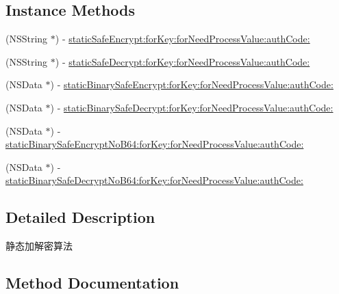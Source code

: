 \subsection*{Instance Methods}
\begin{DoxyCompactItemize}
\item 
(N\+S\+String $\ast$) -\/ \mbox{\hyperlink{protocol_i_open_static_data_encrypt_component_01-p_ae9cf27ee8ba201a8301ed2203f054a91}{static\+Safe\+Encrypt\+:for\+Key\+:for\+Need\+Process\+Value\+:auth\+Code\+:}}
\item 
(N\+S\+String $\ast$) -\/ \mbox{\hyperlink{protocol_i_open_static_data_encrypt_component_01-p_a13515b4080b8829fdb8a08d432498fed}{static\+Safe\+Decrypt\+:for\+Key\+:for\+Need\+Process\+Value\+:auth\+Code\+:}}
\item 
(N\+S\+Data $\ast$) -\/ \mbox{\hyperlink{protocol_i_open_static_data_encrypt_component_01-p_a7221e47b36d729180d20d1efbaedde78}{static\+Binary\+Safe\+Encrypt\+:for\+Key\+:for\+Need\+Process\+Value\+:auth\+Code\+:}}
\item 
(N\+S\+Data $\ast$) -\/ \mbox{\hyperlink{protocol_i_open_static_data_encrypt_component_01-p_a55b365d73c01bf7ad325985bbd83ee64}{static\+Binary\+Safe\+Decrypt\+:for\+Key\+:for\+Need\+Process\+Value\+:auth\+Code\+:}}
\item 
(N\+S\+Data $\ast$) -\/ \mbox{\hyperlink{protocol_i_open_static_data_encrypt_component_01-p_a907c76770df9f876dfd14da3b81c75d0}{static\+Binary\+Safe\+Encrypt\+No\+B64\+:for\+Key\+:for\+Need\+Process\+Value\+:auth\+Code\+:}}
\item 
(N\+S\+Data $\ast$) -\/ \mbox{\hyperlink{protocol_i_open_static_data_encrypt_component_01-p_ad03f7147c6e686a8dfa8a25d9de50083}{static\+Binary\+Safe\+Decrypt\+No\+B64\+:for\+Key\+:for\+Need\+Process\+Value\+:auth\+Code\+:}}
\end{DoxyCompactItemize}


\subsection{Detailed Description}
静态加解密算法 

\subsection{Method Documentation}
\mbox{\label{protocol_i_open_static_data_encrypt_component_01-p_a55b365d73c01bf7ad325985bbd83ee64}} 
